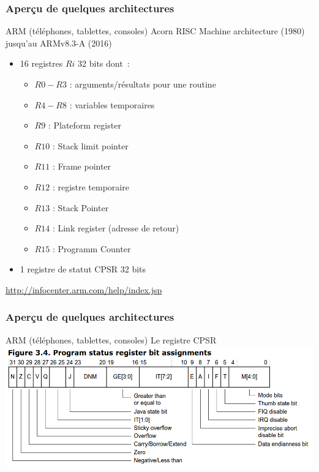 \documentclass{beamer}
\begin{document}
\begin{frame}
  \frametitle{Aperçu de quelques architectures}
  \begin{block}{ARM (téléphones, tablettes, consoles)}
    Acorn RISC Machine architecture (1980) jusqu'au ARMv8.3-A (2016)
    \begin{itemize}
    \item 16 registres $Ri$ 32 bits dont~:
      \begin{itemize}
      \item $R0-R3$ : arguments/résultats pour une routine
      \item $R4-R8$ : variables temporaires
      \item $R9$ : Plateform register
      \item $R10$ : Stack limit pointer
      \item $R11$ : Frame pointer
      \item $R12$ : registre temporaire
      \item $R13$ : Stack Pointer
      \item $R14$ : Link register (adresse de retour)
      \item $R15$ : Programm Counter
      \end{itemize}
    \item 1 registre de statut CPSR 32 bits
    \end{itemize}
  \end{block}
  \url{http://infocenter.arm.com/help/index.jsp}
\end{frame}


\begin{frame}
  \frametitle{Aperçu de quelques architectures}
  \begin{block}{ARM (téléphones, tablettes, consoles)}
    Le registre CPSR\\
    \includegraphics[width=\columnwidth]{Figs/arm_cpsr.png}
  \end{block}
\end{frame}
  
\end{document}
